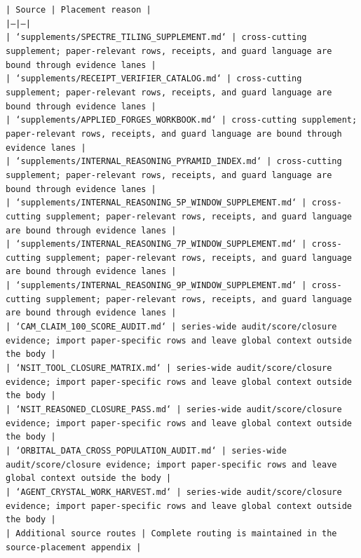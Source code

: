 \documentclass[11pt]{article}
\begin{document}
\noindent\texttt{| Source | Placement reason |}\\
\noindent\texttt{|---|---|}\\
\noindent\texttt{| `supplements/SPECTRE\_TILING\_SUPPLEMENT.md` | cross-cutting supplement; paper-relevant rows, receipts, and guard language are bound through evidence lanes |}\\
\noindent\texttt{| `supplements/RECEIPT\_VERIFIER\_CATALOG.md` | cross-cutting supplement; paper-relevant rows, receipts, and guard language are bound through evidence lanes |}\\
\noindent\texttt{| `supplements/APPLIED\_FORGES\_WORKBOOK.md` | cross-cutting supplement; paper-relevant rows, receipts, and guard language are bound through evidence lanes |}\\
\noindent\texttt{| `supplements/INTERNAL\_REASONING\_PYRAMID\_INDEX.md` | cross-cutting supplement; paper-relevant rows, receipts, and guard language are bound through evidence lanes |}\\
\noindent\texttt{| `supplements/INTERNAL\_REASONING\_5P\_WINDOW\_SUPPLEMENT.md` | cross-cutting supplement; paper-relevant rows, receipts, and guard language are bound through evidence lanes |}\\
\noindent\texttt{| `supplements/INTERNAL\_REASONING\_7P\_WINDOW\_SUPPLEMENT.md` | cross-cutting supplement; paper-relevant rows, receipts, and guard language are bound through evidence lanes |}\\
\noindent\texttt{| `supplements/INTERNAL\_REASONING\_9P\_WINDOW\_SUPPLEMENT.md` | cross-cutting supplement; paper-relevant rows, receipts, and guard language are bound through evidence lanes |}\\
\noindent\texttt{| `CAM\_CLAIM\_100\_SCORE\_AUDIT.md` | series-wide audit/score/closure evidence; import paper-specific rows and leave global context outside the body |}\\
\noindent\texttt{| `NSIT\_TOOL\_CLOSURE\_MATRIX.md` | series-wide audit/score/closure evidence; import paper-specific rows and leave global context outside the body |}\\
\noindent\texttt{| `NSIT\_REASONED\_CLOSURE\_PASS.md` | series-wide audit/score/closure evidence; import paper-specific rows and leave global context outside the body |}\\
\noindent\texttt{| `ORBITAL\_DATA\_CROSS\_POPULATION\_AUDIT.md` | series-wide audit/score/closure evidence; import paper-specific rows and leave global context outside the body |}\\
\noindent\texttt{| `AGENT\_CRYSTAL\_WORK\_HARVEST.md` | series-wide audit/score/closure evidence; import paper-specific rows and leave global context outside the body |}\\
\noindent\texttt{| Additional source routes | Complete routing is maintained in the source-placement appendix |}\\
\end{document}
